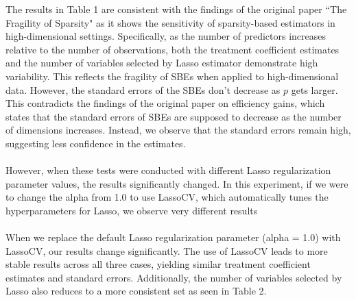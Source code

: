 The results in Table 1 are consistent with the findings of the original paper ``The Fragility of Sparsity" as it shows the sensitivity of sparsity-based estimators in high-dimensional settings. Specifically, as the number of predictors increases relative to the number of observations, both the treatment coefficient estimates and the number of variables selected by Lasso estimator demonstrate high variability. This reflects the fragility of SBEs when applied to high-dimensional data. However, the standard errors of the SBEs don't decrease as $p$ gets larger. This contradicts the findings of the original paper on efficiency gains, which states that the standard errors of SBEs are supposed to decrease as the number of dimensions increases. Instead, we observe that the standard errors remain high, suggesting less confidence in the estimates. \\
\\
However, when these tests were conducted with different Lasso regularization parameter values, the results significantly changed. In this experiment, if we were to change the alpha from 1.0 to use LassoCV, which automatically tunes the hyperparameters for Lasso, we observe very different results\\
\\
When we replace the default Lasso regularization parameter (alpha = 1.0) with LassoCV, our results change significantly. The use of LassoCV leads to more stable results across all three cases, yielding similar treatment coefficient estimates and standard errors. Additionally, the number of variables selected by Lasso also reduces to a more consistent set as seen in Table 2. \\
